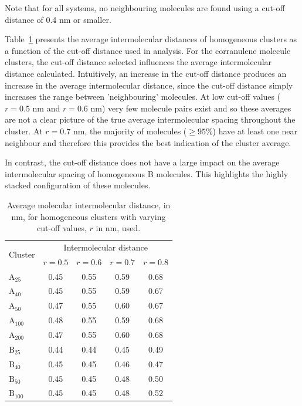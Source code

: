 
Note that for all systems, no neighbouring molecules are found using a cut-off distance of 0.4 nm or smaller.


Table~\ref{tableSI:intermolecdistscutoff} presents the average intermolecular distances of homogeneous clusters as a function of the cut-off distance used in analysis. For the corranulene molecule clusters, the cut-off distance selected influences the average intermolecular distance calculated.  Intuitively, an increase in the cut-off distance produces an increase in the average intermolecular distance, since the cut-off distance simply increases the range between 'neighbouring' molecules. At low cut-off values ($r = 0.5$ nm and $r = 0.6$ nm) very few molecule pairs exist and so these averages are not a clear picture of the true average intermolecular spacing throughout the cluster.  At $r = 0.7$ nm, the majority of molecules ($\ge 95$\%) have at least one near neighbour and therefore this provides the best indication of the cluster average.

In contrast, the cut-off distance does not have a large impact on the average intermolecular spacing of homogeneous B molecules. This highlights the highly stacked configuration of these molecules.




% 
\begin{table}[]
\centering
\caption{Average molecular intermolecular distance, in nm, for homogeneous clusters with varying cut-off values, $r$ in nm, used.}
\label{tableSI:intermolecdistscutoff}
\begin{tabular}{lcccc}
\hline
\multicolumn{1}{l}{\multirow{2}{*}{Cluster}} & \multicolumn{4}{c}{\multirow{1}{*}{Intermolecular distance}} \\
 & $r = 0.5$ & $r = 0.6$ & $r = 0.7$ & $r = 0.8$ \\ \hline
$\text{A}_{\text{25}}$ & 0.45 & 0.55 & 0.59 & 0.68 \\
$\text{A}_{\text{40}}$ & 0.45 & 0.55 & 0.59 & 0.67 \\
$\text{A}_{\text{50}}$ & 0.47 & 0.55 & 0.60 & 0.67 \\
$\text{A}_{\text{100}}$ & 0.48 & 0.55 & 0.59 & 0.68 \\
$\text{A}_{\text{200}}$ & 0.47 & 0.55 & 0.60 & 0.68 \\ \hline
$\text{B}_{\text{25}}$ & 0.44 & 0.44 & 0.45 & 0.49 \\
$\text{B}_{\text{40}}$ & 0.45 & 0.45 & 0.46 & 0.47 \\
$\text{B}_{\text{50}}$ & 0.45 & 0.45 & 0.48 & 0.50 \\ 
$\text{B}_{\text{100}}$ & 0.45 & 0.45 & 0.48 & 0.52 \\ \hline
\end{tabular}
\end{table}
%


